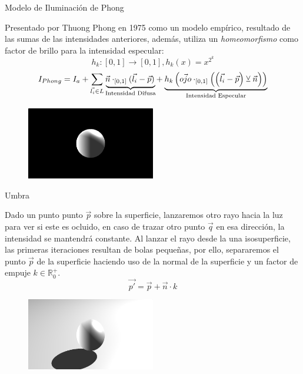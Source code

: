 \begin{frame}{Modelo de Iluminación de Phong}

    Presentado por Thuong Phong en 1975 como un modelo empírico, resultado de las sumas de las intensidades anteriores, además, utiliza un \textit{homeomorfismo} como factor de brillo para la intensidad especular:
    \[h_k:[0,1]\longrightarrow[0,1] , h_k(x)=x^{2^k}\]
    \[I_{Phong}=I_a+\sum_{\Vec{l_i}\in L} \mathrlap{\underbrace{\phantom{\Vec{n}\cdot_{[0, 1]}(\Vec{l_i}-\Vec{p})}}_{\text{Intensidad Difusa}}}\Vec{n}\cdot_{[0, 1]}(\Vec{l_i}-\Vec{p}) + \mathrlap{\underbrace{\phantom{h_k\left(\Vec{ojo}\cdot_{[0, 1]}\left(\left(\Vec{l_i}-\Vec{p}\right) \veebar \Vec{n}\right)\right)}}_{\text{Intensidad Especular}}}h_k\left(\Vec{ojo}\cdot_{[0, 1]}\left(\left(\Vec{l_i}-\Vec{p}\right) \veebar \Vec{n}\right)\right)\]
    
    \begin{figure}[H]
      \centering
      \includegraphics[width=0.5\textwidth]{imagenes/lightmodel/phong.png}
    \end{figure}
    
\end{frame}

\begin{frame}{Umbra}

    Dado un punto punto \(\Vec{p}\) sobre la superficie, lanzaremos otro rayo hacia la luz para ver si este es ocluido, en caso de trazar otro punto \(\Vec{q}\) en esa dirección, la intensidad se mantendrá constante.
    \vfill
    Al lanzar el rayo desde la una isosuperficie, las primeras iteraciones resultan de bolas pequeñas, por ello, separaremos el punto \(\Vec{p}\) de la superficie haciendo uso de la normal de la superficie y un factor de empuje \(k\in\mathbb{R}^{+}_{0}\).
    \[\Vec{p'}=\Vec{p} + \Vec{n} \cdot k\]
    \vfill
    \begin{figure}[H]
      \centering
      \includegraphics[width=0.5\textwidth]{imagenes/lightmodel/sombra_dura.png}
    \end{figure}
    
\end{frame}